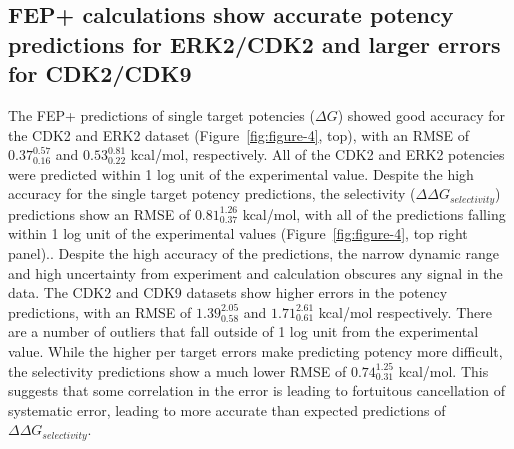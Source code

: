 \documentclass[phd,tocprelim]{cornell}
\begin{document}
\subsection{FEP+ calculations show accurate potency predictions for ERK2/CDK2 and larger errors for CDK2/CDK9}
The FEP+ predictions of single target potencies ($\Delta G$) showed good accuracy for the CDK2 and ERK2 dataset (Figure~\ref{fig:figure-4}, top), with an RMSE of $0.37^{0.57}_{0.16}$ and $0.53^{0.81}_{0.22}$ kcal/mol, respectively. All of the CDK2 and ERK2 potencies were predicted within 1 log unit of the experimental value. Despite the high accuracy for the single target potency predictions, the selectivity ($\Delta \Delta G_{selectivity}$) predictions show an RMSE of $0.81^{1.26}_{0.37}$ kcal/mol, with all of the predictions falling within 1 log unit of the experimental values (Figure~\ref{fig:figure-4}, top right panel).. Despite the high accuracy of the predictions, the narrow dynamic range and high uncertainty from experiment and calculation obscures any signal in the data. 
The CDK2 and CDK9 datasets show higher errors in the potency predictions, with an RMSE of $1.39^{2.05}_{0.58}$ and $1.71^{2.61}_{0.61}$ kcal/mol respectively. There are a number of outliers that fall outside of 1 log unit from the experimental value. While the higher per target errors make predicting potency more difficult, the selectivity predictions show a much lower RMSE of $0.74^{1.25}_{0.31}$ kcal/mol. This suggests that some correlation in the error is leading to fortuitous cancellation of systematic error, leading to more accurate than expected predictions of $\Delta \Delta G_{selectivity}$. 
\end{document}
